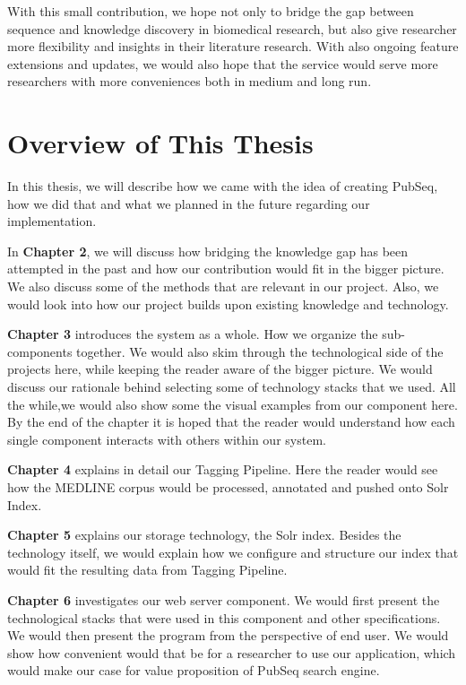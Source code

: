 With this small contribution, we hope not only to bridge the gap between sequence and knowledge discovery in biomedical research, but also give researcher more flexibility and insights in their literature research. With also ongoing feature extensions and updates, we would also hope that the service would serve more researchers with more conveniences both in medium and long run.

\section{Overview of This Thesis}

In this thesis, we will describe how we came with the idea of creating PubSeq, how we did that and what we planned in the future regarding our implementation.

In \textbf{Chapter 2}, we will discuss how bridging the knowledge gap has been attempted in the past and how our contribution would fit in the bigger picture. We also discuss some of the methods that are relevant in our project. Also, we would look into how our project builds upon existing knowledge and technology.

\textbf{Chapter 3} introduces the system as a whole. How we organize the sub-components together. We would also skim through the technological side of the projects here, while keeping the reader aware of the bigger picture. We would discuss our rationale behind selecting some of technology stacks that we used. All the while,we would also show some the visual examples from our component here. By the end of the chapter it is hoped that the reader would understand how each single component interacts with others within our system.

\textbf{Chapter 4} explains in detail our Tagging Pipeline. Here the reader would see how the MEDLINE corpus would be processed, annotated and pushed onto Solr Index.

\textbf{Chapter 5} explains our storage technology, the Solr index. Besides the technology itself, we would explain how we configure and structure our index that would fit the resulting data from Tagging Pipeline.

\textbf{Chapter 6} investigates our web server component. We would first present the technological stacks that were used in this component and other specifications. We would then present the program from the perspective of end user. We would show how convenient would that be for a researcher to use our application, which would make our case for value proposition of PubSeq search engine.

